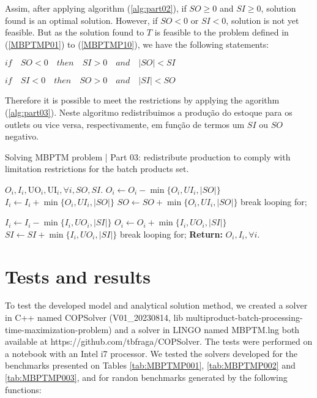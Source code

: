 \documentclass[authoryear,manuscript,12pt]{elsarticle}
\begin{document}
Assim, after applying algorithm (\ref{alg:part02}), if $SO \geq 0$ and $SI \geq 0$, solution found is an optimal solution. However, if $SO < 0$ or $SI <0$, solution is not yet feasible. But as the solution found to $T$ is feasible to the problem defined in (\ref{MBPTMP01}) to (\ref{MBPTMP10}), we have the following statements:

$if \quad SO < 0 \quad then \quad SI > 0 \quad and  \quad |SO| < SI$

$if \quad SI < 0 \quad then \quad SO > 0 \quad and  \quad |SI| < SO$

Therefore it is possible to meet the restrictions by applying the agorithm (\ref{alg:part03}). Neste algoritmo redistribuimos a produção do estoque para os outlets ou vice versa, respectivamente, em função de termos um $SI$ ou $SO$ negativo.

\begin{algorithm}
\caption{Solving MBPTM problem | Part 03: redistribute production to comply with limitation restrictions for the batch products set.}\label{alg:part03}
\begin{algorithmic}
\Require $O_i, I_i, \textrm{UO}_i, \textrm{UI}_i, \forall i, SO, SI$.
	\State $O_i \gets O_i - \min\{ O_i, UI_i, |SO|\}$
	\State $I_i \gets I_i + \min\{ O_i, UI_i, |SO|\}$
	\State $SO \gets SO + \min\{ O_i, UI_i, |SO|\}$
		break looping for;
	\EndIf
\EndFor
\EndIf

	\State $I_i \gets I_i - \min\{ I_i, UO_i, |SI|\}$
	\State $O_i \gets O_i + \min\{ I_i, UO_i, |SI|\}$
	\State $SI \gets SI + \min\{ I_i, UO_i, |SI|\}$
		break looping for;
	\EndIf
\EndFor
\EndIf
\State \textbf{Return:} $O_i, I_i, \forall i$.
\end{algorithmic}
\end{algorithm}

\section{Tests and results}
\label{sec:results}

To test the developed model and analytical solution method, we created a solver in C++ named COPSolver (V01\_20230814, lib multiproduct-batch-processing-time-maximization-problem) and a solver in LINGO named MBPTM.lng both available at https://github.com/tbfraga/COPSolver. The tests were performed on a notebook with an Intel i7 processor. We tested the solvers developed for the benchmarks presented on Tables \ref{tab:MBPTMP001}, \ref{tab:MBPTMP002} and \ref{tab:MBPTMP003}, and for randon benchmarks generated by the following functions: \\
\end{document}
